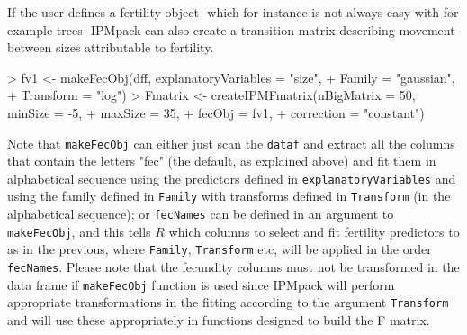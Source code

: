 \documentclass{article}
\begin{document}
If the user defines a fertility object -which for instance is not always easy with for example trees- IPMpack can also create a transition matrix describing movement between sizes attributable to fertility.
\begin{Schunk}
\begin{Sinput}
> fv1 <- makeFecObj(dff, explanatoryVariables = "size", 	
+                   Family = "gaussian", 
+                   Transform = "log")
> Fmatrix <- createIPMFmatrix(nBigMatrix = 50, minSize = -5,
+                             maxSize = 35, 
+                             fecObj = fv1, 
+                             correction = "constant")
\end{Sinput}
\end{Schunk}
Note that {\tt makeFecObj} can either just scan the {\tt dataf} and extract all the columns that contain the letters "fec" (the default, as explained above) and fit them in alphabetical sequence using the predictors defined in {\tt explanatoryVariables} and using the family defined in {\tt Family} with transforms defined in {\tt Transform} (in the alphabetical sequence); or {\tt fecNames} can be defined in an argument to {\tt makeFecObj}, and this tells $R$ which columns to select and fit fertility predictors to as in the previous, where {\tt Family}, {\tt Transform} etc, will be applied in the order {\tt fecNames}. Please note that the fecundity columns must not be transformed in the data frame if {\tt makeFecObj} function is used since IPMpack will perform appropriate transformations in the fitting according to the argument {\tt Transform} and will use these appropriately in functions designed to build the F matrix. 
\end{document}

